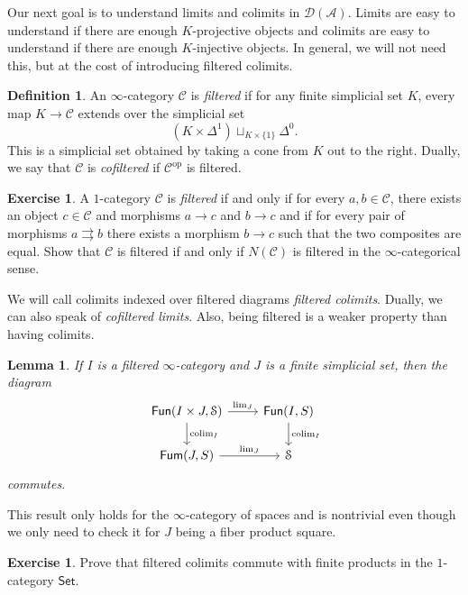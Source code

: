 \documentclass[10pt]{amsart}
\newtheorem{lem}[thm]{Lemma}
\theoremstyle{definition}
\newtheorem{defn}[thm]{Definition}
\newtheorem{exer}[thm]{Exercise}
\theoremstyle{remark}
\theoremstyle{plain}
\theoremstyle{definition}
\theoremstyle{remark}
\newcommand{\mc}[1]{\mathcal{#1}}
\newcommand{\ms}[1]{\mathsf{#1}}
\newcommand{\1}{\mathbf{1}}
\newcommand{\2}{\mathbf{2}}
\newcommand{\3}{\mathbf{3}}
\DeclareMathOperator{\op}{op}
\DeclareMathOperator*{\colim}{colim}
\begin{document}
Our next goal is to understand limits and colimits in $\mc{D}(\mc{A})$. Limits are easy to understand if there are enough $K$-projective objects and colimits are easy to understand if there are enough $K$-injective objects. In general, we will not need this, but at the cost of introducing filtered colimits.

\begin{defn}
    An $\infty$-category $\mc{C}$ is \textit{filtered} if for any finite simplicial set $K$, every map $K \to \mc{C}$ extends over the simplicial set
    \[ (K \times \Delta^1) \sqcup_{K \times \{1\}} \Delta^0. \]
    This is a simplicial set obtained by taking a cone from $K$ out to the right. Dually, we say that $\mc{C}$ is \textit{cofiltered} if $\mc{C}^{\op}$ is filtered.
\end{defn}

\begin{exer}
    A $1$-category $\mc{C}$ is \textit{filtered} if and only if for every $a, b \in \mc{C}$, there exists an object $c \in \mc{C}$ and morphisms $a \to c$ and $b\to c$ and if for every pair of morphisms $a \rightrightarrows b$ there exists a morphism $b \to c$ such that the two composites are equal. Show that $\mc{C}$ is filtered if and only if $N(\mc{C})$ is filtered in the $\infty$-categorical sense.
\end{exer}

We will call colimits indexed over filtered diagrams \textit{filtered colimits}. Dually, we can also speak of \textit{cofiltered limits}. Also, being filtered is a weaker property than having colimits.

\begin{lem}
    If $I$ is a filtered $\infty$-category and $J$ is a finite simplicial set, then the diagram
    \begin{equation*}
    \begin{tikzcd}
        \ms{Fun}(I \times J, \mc{S}) \ar{d}{\colim_I} \ar{r}{\lim_J} & \ms{Fun}(I, S) \ar{d}{\colim_I} \\
        \ms{Fum}(J, S) \ar{r}{\lim_J} & \mc{S}
    \end{tikzcd}
    \end{equation*}
    commutes.
\end{lem}

This result only holds for the $\infty$-category of spaces and is nontrivial even though we only need to check it for $J$ being a fiber product square.

\begin{exer}
    Prove that filtered colimits commute with finite products in the $1$-category $\ms{Set}$.
\end{exer}
\end{document}
